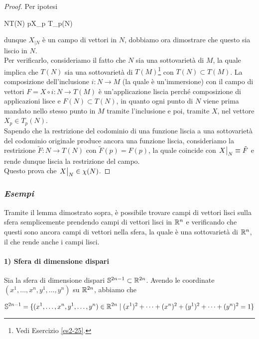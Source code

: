 \begin{proof}
	Per ipotesi
	
		{N}{T(N)}
		{p}{X_{p} \in T_{p}(N)}
	
	dunque $ X_{|N} $ è un campo di vettori in $ N $, dobbiamo ora dimostrare che questo sia liscio in $ N $.\\
	Per verificarlo, consideriamo il fatto che $ N $ sia una sottovarietà di $ M $, la quale implica che $ T(N) $ sia una sottovarietà di $ T(M) $\footnote{%
		Vedi Esercizio \ref{es2-25}.%
	} con $ T(N) \subset T(M) $. La composizione dell'inclusione $ i : N \to M $ (la quale è un'immersione) con il campo di vettori $ F = X \circ i : N \to T(M) $ è un'applicazione liscia perché composizione di applicazioni lisce e $ F(N) \subset T(N) $, in quanto ogni punto di $ N $ viene prima mandato nello stesso punto in $ M $ tramite l'inclusione e poi, tramite $ X $, nel vettore $ X_{p} \in T_{p}(N) $.\\
	Sapendo che la restrizione del codominio di una funzione liscia a una sottovarietà del codominio originale produce ancora una funzione liscia, consideriamo la restrizione $ \tilde{F} : N \to T(N) $ con $ \tilde{F}(p) = F(p) $, la quale coincide con $ \eval{X}_{N} \equiv \tilde{F} $ e rende dunque liscia la restrizione del campo.\\
	Questo prova che $ \eval{X}_{N} \in \chi(N) $.
\end{proof}

\subsubsection{\textit{Esempi}}

Tramite il lemma dimostrato sopra, è possibile trovare campi di vettori lisci sulla sfera semplicemente prendendo campi di vettori lisci in $ \mathbb{R}^{n} $ e verificando che questi sono ancora campi di vettori nella sfera, la quale è una sottovarietà di $ \mathbb{R}^{n} $, il che rende anche i campi lisci.

\paragraph{1) Sfera di dimensione dispari}

Sia la sfera di dimensione dispari $ \mathbb{S}^{2n-1} \subset \mathbb{R}^{2n} $. Avendo le coordinate $ (x^{1},\dots,x^{n},y^{1},\dots,y^{n}) $ su $ \mathbb{R}^{2n} $, abbiamo che

\begin{equation}
	\mathbb{S}^{2n-1} = \{ (x^{1},\dots,x^{n},y^{1},\dots,y^{n}) \in \mathbb{R}^{2n} \mid (x^{1})^{2} + \cdots + (x^{n})^{2} + (y^{1})^{2} + \cdots + (y^{n})^{2} = 1 \}
\end{equation}

